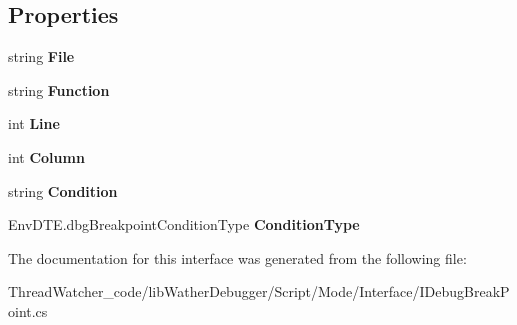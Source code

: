 \subsection*{Properties}
\begin{DoxyCompactItemize}
\item 
\hypertarget{interfacelib_wather_debugger_1_1_script_1_1_mode_1_1_interface_1_1_i_debug_break_point_a3d879511b21c58f14972e634bb2c0039}{string {\bfseries File}}\label{interfacelib_wather_debugger_1_1_script_1_1_mode_1_1_interface_1_1_i_debug_break_point_a3d879511b21c58f14972e634bb2c0039}

\item 
\hypertarget{interfacelib_wather_debugger_1_1_script_1_1_mode_1_1_interface_1_1_i_debug_break_point_a0d89d3b4d84e23a12fc8b4bcbfb22b99}{string {\bfseries Function}}\label{interfacelib_wather_debugger_1_1_script_1_1_mode_1_1_interface_1_1_i_debug_break_point_a0d89d3b4d84e23a12fc8b4bcbfb22b99}

\item 
\hypertarget{interfacelib_wather_debugger_1_1_script_1_1_mode_1_1_interface_1_1_i_debug_break_point_a5a42458a6da9deedca73459ce33b0774}{int {\bfseries Line}}\label{interfacelib_wather_debugger_1_1_script_1_1_mode_1_1_interface_1_1_i_debug_break_point_a5a42458a6da9deedca73459ce33b0774}

\item 
\hypertarget{interfacelib_wather_debugger_1_1_script_1_1_mode_1_1_interface_1_1_i_debug_break_point_ada77063b79ce0b869b228e14862beed9}{int {\bfseries Column}}\label{interfacelib_wather_debugger_1_1_script_1_1_mode_1_1_interface_1_1_i_debug_break_point_ada77063b79ce0b869b228e14862beed9}

\item 
\hypertarget{interfacelib_wather_debugger_1_1_script_1_1_mode_1_1_interface_1_1_i_debug_break_point_a39abe6bd38bdf9e24c89ef29aaf652dc}{string {\bfseries Condition}}\label{interfacelib_wather_debugger_1_1_script_1_1_mode_1_1_interface_1_1_i_debug_break_point_a39abe6bd38bdf9e24c89ef29aaf652dc}

\item 
\hypertarget{interfacelib_wather_debugger_1_1_script_1_1_mode_1_1_interface_1_1_i_debug_break_point_af5b5c0113f0e43bb3247375c57df7b1e}{Env\+D\+T\+E.\+dbg\+Breakpoint\+Condition\+Type {\bfseries Condition\+Type}}\label{interfacelib_wather_debugger_1_1_script_1_1_mode_1_1_interface_1_1_i_debug_break_point_af5b5c0113f0e43bb3247375c57df7b1e}

\end{DoxyCompactItemize}


The documentation for this interface was generated from the following file\+:\begin{DoxyCompactItemize}
\item 
Thread\+Watcher\+\_\+code/lib\+Wather\+Debugger/\+Script/\+Mode/\+Interface/I\+Debug\+Break\+Point.\+cs\end{DoxyCompactItemize}
